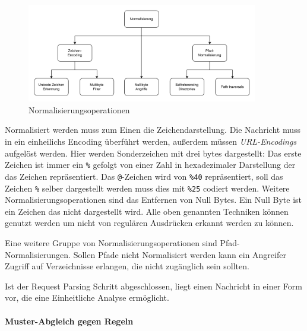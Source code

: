 \begin{figure}[!hbt]
    \centering
    \includegraphics[width=0.9\textwidth]{./images/Normalisierung.png}
    \caption{Normalisierungsoperationen}
    \label{fig:norming}
\end{figure}

Normalisiert werden muss zum Einen die Zeichendarstellung.
Die Nachricht muss in ein einheilichs Encoding überführt werden, außerdem müssen \textit{URL-Encodings} aufgelöst werden.
Hier werden Sonderzeichen mit drei bytes dargestellt:
Das erste Zeichen ist immer ein \verb|%| gefolgt von einer Zahl in hexadezimaler Darstellung der das Zeichen repräsentiert.
Das \verb|@|-Zeichen wird von \verb|%40| repräsentiert, soll das Zeichen \verb|%| selber dargestellt werden muss dies mit \verb|%25| codiert werden.
Weitere Normalisierungsoperationen sind das Entfernen von Null Bytes.
Ein Null Byte ist ein Zeichen das nicht dargestellt wird.
Alle oben genannten Techniken können genutzt werden um nicht von regulären Ausdrücken erkannt werden zu können.

Eine weitere Gruppe von Normalisierungsoperationen sind Pfad-Normalisierungen.
Sollen Pfade nicht Normalisiert werden kann ein Angreifer Zugriff auf Verzeichnisse erlangen, die nicht zugänglich sein sollten.

Ist der Request Parsing Schritt abgeschlossen, liegt einen Nachricht in einer Form vor, die eine Einheitliche Analyse ermöglicht.

\paragraph{Muster-Abgleich gegen Regeln}


